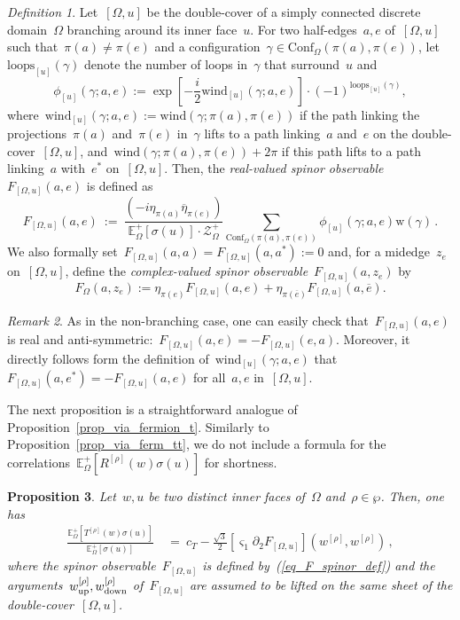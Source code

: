 \documentclass[reqno,11pt,a4paper]{amsart}
\newtheorem{proposition}{Proposition}[section]
\theoremstyle{remark}
\newtheorem{definition}[proposition]{Definition}
\newtheorem{remark}[proposition]{Remark}
\newcommand{\loopsU}{\mathrm{loops}_{[u]}}
\newcommand{\CmT}{c_T}
\newcommand{\Reta}{R^{[\eta]}}
\newcommand{\Trho}{T^{[\rho]}}
\newcommand{\Rrho}{R^{[\rho]}}
\newcommand{\E}{\mathbb{E}_\Omega}
\newcommand{\OmegaU}{{[\Omega,u]}}
\newcommand{\weta}{w^{\left[\eta \right]}}
\newcommand{\wieta}{w^{\left[i\eta \right]}}
\newcommand{\wrho}{w^{\left[\rho \right]}}
\newcommand{\wup}{\weta_{\vphantom{\mathrm{d}}\mathrm{up}}}
\renewcommand{\wup}{\wrho_{\vphantom{\mathrm{d}}\mathrm{up}}}
\newcommand{\wdown}{\weta_{\mathrm{down}}}
\renewcommand{\wdown}{\wrho_{\mathrm{down}}}
\newcommand{\wind}{\mathrm{wind}}
\newcommand{\windU}{\mathrm{wind}_{[u]}}
\newcommand{\phaseU}{\phi_{[u]}}
\newcommand{\weight}{\mathrm{w}}
\newcommand{\F}{F_\Omega}       \newcommand{\Fdelta}{F_{\Omega_\delta}}
\newcommand{\FU}{F_\OmegaU}     \newcommand{\FdeltaU}{F_{[\Omega_\delta,u_\delta]}}
\newcommand{\conf}{\mathrm{Conf}}
\newcommand{\dOne}{\partial_1}
\newcommand{\dTwo}{\partial_2}
\newcommand{\sOne}{\varsigma_1}
\newcommand\ConfO[1]{\conf_\Omega(#1)}
\def\cZ{\mathcal Z}
\begin{document}
\begin{definition}
\label{def_spinor}
Let~$\OmegaU$ be the double-cover of a simply connected discrete domain~$\Omega$ branching around its inner face~$u$. For two half-edges~$a,e$ of~$\OmegaU$ such that~$\pi(a)\ne\pi(e)$ and a configuration~$\gamma\in\ConfO{\pi(a),\pi(e)}$, let $\loopsU(\gamma)$ denote the number of loops in~$\gamma$ that surround~$u$ and
\begin{equation}
\label{eq_phaseU_def}
\phaseU(\gamma;a,e) := \exp \left[ -{\textstyle\frac{i}{2}}\windU(\gamma;a,e) \right]\cdot (-1)^{\loopsU(\gamma)},
\end{equation}
where~$\windU(\gamma;a,e):=\wind(\gamma;\pi(a),\pi(e))$ if the path linking the projections~$\pi(a)$ and~$\pi(e)$ in~$\gamma$ lifts to a path linking~$a$ and~$e$ on the double-cover~$\OmegaU$, and~$\wind(\gamma;\pi(a),\pi(e))+2\pi$ if this path lifts to a path linking~$a$ with~$e^*$ on~$\OmegaU$. Then, the \emph{real-valued spinor observable}~$\FU(a,e)$ is defined as
\begin{equation}
\label{eq_F_spinor_def}
\FU(a,e)~:=~\frac{(-i\eta_{\pi(a)}\overline{\eta}_{\pi(e)})}{\E^+[\sigma(u)]\cdot\cZ_\Omega^+} \sum_{\ConfO{\pi(a),\pi(e)}}\phaseU(\gamma;a,e)\weight(\gamma)\,.
\end{equation}
We also formally set~$\FU(a,a)=\FU(a,a^*):=0$ and, for a midedge~$z_e$ on~$\OmegaU$, define the \emph{complex-valued spinor observable}~$\FU(a,z_e)$ by
\[
\F(a,z_e):= {\eta}_{\pi(e)}\FU(a,e)+{\eta}_{\pi(\overline{e})}\FU(a,\overline{e}).
\]
\end{definition}

\begin{remark}
\label{rem:spinor-discrete} As in the non-branching case, one can easily check that~$\FU(a,e)$ is real and anti-symmetric:~$\FU(a,e)=-\FU(e,a)$. Moreover, it directly follows form the definition of~$\windU(\gamma;a,e)$ that~$\FU(a,e^*)=-\FU(a,e)$ for all~$a,e$ in~$\OmegaU$.
\end{remark}

The next proposition is a straightforward analogue of Proposition~\ref{prop_via_fermion_t}. Similarly to Proposition~\ref{prop_via_ferm_tt}, we do not include a formula for the correlations~$\E^+[\Rrho(w)\sigma(u)]$ for shortness.

\begin{proposition}
\label{prop_via_fermion_ts}
Let~$w,u$ be two { distinct} inner faces of~$\Omega$ and~$\rho\in\wp$. Then, one has
\begin{align*}
\frac{\E^+[\Trho(w)\sigma(u)]}{\E^+[\sigma(u)]} &~=~ \CmT-{\textstyle\frac{\sqrt{3}}{2}}[\sOne\dTwo\FU](\wrho,\wrho)\,,
\end{align*}
where
the spinor observable~$\FU$ is defined by~(\ref{eq_F_spinor_def}) and the arguments~$\wup,\wdown$ of~$\FU$ are assumed to be lifted on the same sheet of the double-cover~$\OmegaU$.
\end{proposition}
\end{document}
